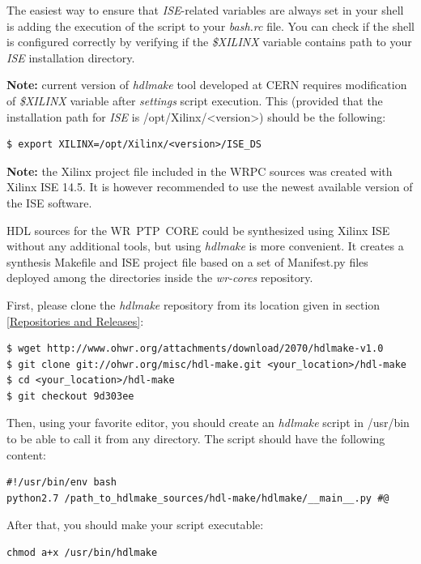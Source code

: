 \documentclass[a4paper, 12pt]{article}
\newcommand{\codeHook}[1]{\mbox{\ttfamily\MakeTextUppercase{#1}}}
\begin{document}
The easiest way to ensure that \textit{ISE}-related variables are always set in your
shell is adding the execution of the script to your \textit{bash.rc} file. You can
check if the shell is configured correctly by verifying if the \textit{\$XILINX}
variable contains path to your \textit{ISE} installation directory.

\textbf{Note:} current version of \textit{hdlmake} tool developed at CERN requires
modification of \textit{\$XILINX} variable after \textit{settings} script execution.
This (provided that the installation path for \textit{ISE} is /opt/Xilinx/<version>)
should be the following:

\begin{lstlisting}
$ export XILINX=/opt/Xilinx/<version>/ISE_DS
\end{lstlisting}

\textbf{Note:} the Xilinx project file included in the \codeHook{wrpc} sources was created
with Xilinx ISE 14.5. It is however recommended to use the newest available
version of the ISE software.

\vspace{1em}
HDL sources for the \codeHook{wr ptp core} could be synthesized using Xilinx ISE without
any additional tools, but using \textit{hdlmake} is more convenient. It creates a
synthesis Makefile and ISE project file based on a set of Manifest.py files
deployed among the directories inside the \textit{wr-cores} repository.

First, please clone the \textit{hdlmake} repository from its location given in
section \ref{Repositories and Releases}:\newpage
\begin{lstlisting}
$ wget http://www.ohwr.org/attachments/download/2070/hdlmake-v1.0
$ git clone git://ohwr.org/misc/hdl-make.git <your_location>/hdl-make
$ cd <your_location>/hdl-make
$ git checkout 9d303ee
\end{lstlisting}

Then, using your favorite editor, you should create an \textit{hdlmake} script in
/usr/bin to be able to call it from any directory. The script should have the
following content:
\begin{lstlisting}
#!/usr/bin/env bash
python2.7 /path_to_hdlmake_sources/hdl-make/hdlmake/__main__.py #@
\end{lstlisting}

After that, you should make your script executable:
\begin{lstlisting}
chmod a+x /usr/bin/hdlmake
\end{lstlisting}
\end{document}
